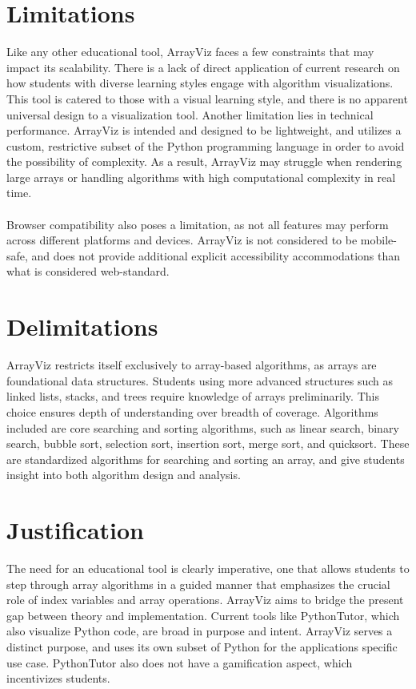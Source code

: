 \documentclass{article}
\begin{document}
\section{Limitations}
Like any other educational tool, ArrayViz faces a few constraints that may impact its scalability. There is a lack of direct application of current research on how students with diverse learning styles engage with algorithm visualizations. This tool is catered to those with a visual learning style, and there is no apparent universal design to a visualization tool. Another limitation lies in technical performance. ArrayViz is intended and designed to be lightweight, and utilizes a custom, restrictive subset of the Python programming language in order to avoid the possibility of complexity. As a result, ArrayViz may struggle when rendering large arrays or handling algorithms with high computational complexity in real time. \\
\\
Browser compatibility also poses a limitation, as not all features may perform across different platforms and devices. ArrayViz is not considered to be mobile-safe, and does not provide additional explicit accessibility accommodations than what is considered web-standard.
\section{Delimitations}
ArrayViz restricts itself exclusively to array-based algorithms, as arrays are foundational data structures. Students using more advanced structures such as linked lists, stacks, and trees require knowledge of arrays preliminarily. This choice ensures depth of understanding over breadth of coverage. Algorithms included are core searching and sorting algorithms, such as linear search, binary search, bubble sort, selection sort, insertion sort, merge sort, and quicksort. These are standardized algorithms for searching and sorting an array, and give students insight into both algorithm design and analysis.
\section{Justification}
The need for an educational tool is clearly imperative, one that allows students to step through array algorithms in a guided manner that emphasizes the crucial role of index variables and array operations. ArrayViz aims to bridge the present gap between theory and implementation. Current tools like PythonTutor, which also visualize Python code, are broad in purpose and intent. ArrayViz serves a distinct purpose, and uses its own subset of Python for the applications specific use case. PythonTutor also does not have a gamification aspect, which incentivizes students. 
\end{document}
